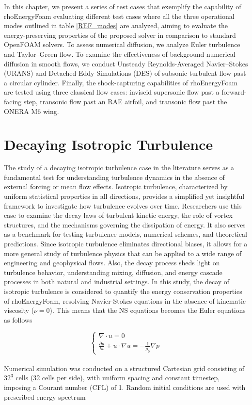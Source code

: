 \documentclass[a5paper]{sapthesis}
\begin{document}
	In this chapter, we present a series of test cases that exemplify the capability of rhoEnergyFoam evaluating different test cases where all the three operational modes outlined in table \ref{REF_modes} are analyzed, aiming to evaluate the energy-preserving properties of the proposed solver in comparison to standard OpenFOAM solvers. To assess numerical diffusion, we analyze Euler turbulence and Taylor–Green flow. To examine the effectiveness of background numerical diffusion in smooth flows, we conduct Unsteady Reynolds-Averaged Navier–Stokes (URANS) and Detached Eddy Simulations (DES) of subsonic turbulent flow past a circular cylinder. Finally, the shock-capturing capabilities of rhoEnergyFoam are tested using three classical flow cases: inviscid supersonic flow past a forward-facing step, transonic flow past an RAE airfoil, and transonic flow past the ONERA M6 wing.
	
	\section{Decaying Isotropic Turbulence}
	The study of a decaying isotropic turbulence case in the literature serves as a fundamental test for understanding turbulence dynamics in the absence of external forcing or mean flow effects. Isotropic turbulence, characterized by uniform statistical properties in all directions, provides a simplified yet insightful framework to investigate how turbulence evolves over time. Researchers use this case to examine the decay laws of turbulent kinetic energy, the role of vortex structures, and the mechanisms governing the dissipation of energy. It also serves as a benchmark for testing turbulence models, numerical schemes, and theoretical predictions. Since isotropic turbulence eliminates directional biases, it allows for a more general study of turbulence physics that can be applied to a wide range of engineering and geophysical flows. Also, the decay process sheds light on turbulence behavior, understanding mixing, diffusion, and energy cascade processes in both natural and industrial settings.
	In this study, the decay of isotropic turbulence is considered to quantify the energy conservation properties of rhoEnergyFoam, resolving Navier-Stokes equations in the absence of kinematic viscosity ($\nu = 0$). This means that the NS equations becomes the Euler equations as follows
	
	\begin{equation}
		\begin{cases}
			\nabla \cdot u = 0 \\
			\frac{\partial u}{\partial t} + u \cdot \nabla u = - \frac{1}{\rho_0} \nabla p
		\end{cases}
	\end{equation}
	\\
	Numerical simulation was conducted on a structured Cartesian grid consisting of $32^3$ cells (32 cells per side), with uniform spacing and constant timestep, imposing a Courant number (CFL) of 1. Random initial conditions are used with prescribed energy spectrum
	
\end{document}
